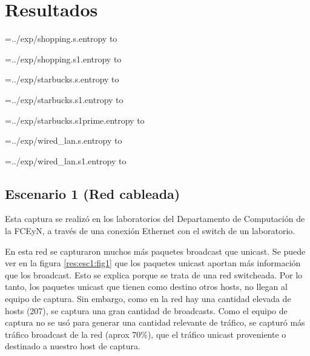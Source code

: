 
\section{Resultados}

\newread\tmp

\openin\tmp=../exp/shopping.s.entropy
\read\tmp to \ShoppingSEntropy
\closein\tmp

\openin\tmp=../exp/shopping.s1.entropy
\read\tmp to \ShoppingSOneEntropy
\closein\tmp

\openin\tmp=../exp/starbucks.s.entropy
\read\tmp to \StarbucksSEntropy
\closein\tmp

\openin\tmp=../exp/starbucks.s1.entropy
\read\tmp to \StarbucksSOneEntropy
\closein\tmp

\openin\tmp=../exp/starbucks.s1prime.entropy
\read\tmp to \StarbucksSOnePrimeEntropy
\closein\tmp

\openin\tmp=../exp/wired_lan.s.entropy
\read\tmp to \WiredLanSEntropy
\closein\tmp

\openin\tmp=../exp/wired_lan.s1.entropy
\read\tmp to \WiredLanSOneEntropy
\closein\tmp


\newcommand\WiredLanNodeCount{207}
\newcommand\ShoppingNodeCount{30}
\newcommand\StarbucksNodeCount{14}


\subsection{Escenario 1 (Red cableada)}

Esta captura se realizó en los laboratorios del Departamento de Computación de la FCEyN, a través de una conexión Ethernet con el switch de un laboratorio.

En esta red se capturaron muchos más paquetes broadcast que unicast. Se puede ver en la figura \ref{res:esc1:fig1}
que los paquetes unicast aportan más información que los broadcast. Esto se explica porque se trata de una red switcheada. Por lo tanto, los paquetes unicast que tienen como destino otros hosts, no llegan al equipo de captura. Sin embargo, como en la red hay una cantidad elevada de hosts (207), se captura una gran cantidad de broadcasts. Como el equipo de captura no se usó para generar una cantidad relevante de tráfico, se capturó más tráfico broadcast de la red (aprox 70\%), que el tráfico unicast proveniente o destinado a nuestro host de captura.

